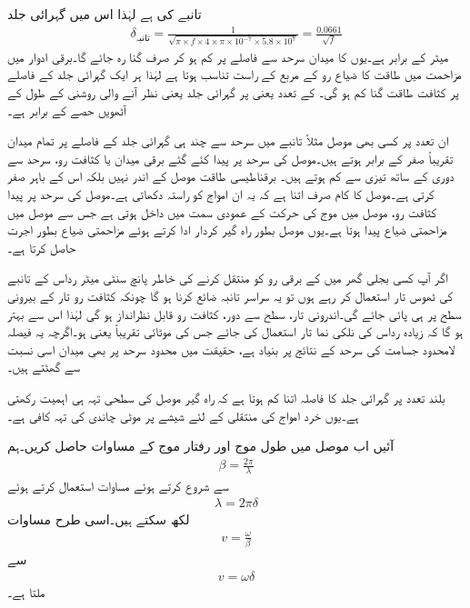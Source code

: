 تانبے کی  ہے لہٰذا اس میں گہرائی جلد
\begin{align*}
\delta_{\text{تانبہ}}=\frac{1}{\sqrt{\pi \times f  \times 4 \times \pi \times 10^{-7} \times 5.8 \times 10^{7}}}=\frac{0.0661}{\sqrt{f}}
\end{align*}
میٹر کے برابر ہے۔یوں  کا میدان سرحد سے  فاصلے پر کم ہو کر صرف  گنا رہ جائے گا۔برقی ادوار میں مزاحمت میں طاقت کا ضیاع رو کے مربع کے راست تناسب ہوتا ہے لہٰذا ہر ایک گہرائی جلد کے فاصلے پر کثافت طاقت  گنا کم ہو گی۔ کے تعدد یعنی  پر گہرائی جلد  یعنی نظر آنے والی روشنی کے طول کے آٹھویں حصے  کے برابر ہے۔

ان تعدد پر کسی بھی موصل مثلاً تانبے میں سرحد سے چند ہی گہرائی جلد کے فاصلے پر تمام میدان تقریباً صفر کے برابر ہوتے ہیں۔موصل کی سرحد پر پیدا کئے گئے برقی میدان یا کثافت رو، سرحد سے دوری کے ساتھ تیزی سے کم ہوتے ہیں۔ برقناطیسی طاقت موصل کے اندر نہیں بلکہ اس کے باہر صفر کرتی ہے۔موصل کا کام صرف اتنا ہے کہ یہ ان امواج کو راستہ دکھاتی ہے۔موصل کی سرحد پر پیدا کثافت رو، موصل میں موج کی حرکت کے عمودی سمت میں داخل ہوتی ہے جس سے موصل میں مزاحمتی ضیاع پیدا ہوتا ہے۔یوں موصل بطور راہ گیر  کردار ادا کرتے ہوئے مزاحمتی ضیاع بطور اجرت حاصل کرتا ہے۔  

اگر آپ کسی بجلی گھر میں   کے برقی رو کو منتقل کرنے کی خاطر پانچ سنٹی میٹر رداس کے تانبے کی ٹھوس تار استعمال کر رہے ہوں تو یہ سراسر تانبہ ضائع کرنا ہو گا چونکہ کثافت رو تار کے بیرونی سطح پر ہی پائی جائے گی۔اندرونی تار، سطح سے دور، کثافت رو قابل نظرانداز ہو گی لہٰذا اس سے بہتر ہو گا کہ زیادہ رداس کی نلکی نما تار استعمال کی جائے جس کی موٹائی تقریباً  یعنی  ہو۔اگرچہ یہ فیصلہ لامحدود جسامت کی سرحد کے نتائج پر بنیاد ہے، حقیقت میں محدود سرحد پر بھی میدان اسی نسبت سے گھٹتے ہیں۔

بلند تعدد پر گہرائی جلد کا فاصلہ اتنا کم ہوتا ہے کہ راہ گیر موصل کی سطحی تہہ ہی اہمیت رکھتی ہے۔یوں خرد امواج کی منتقلی کے لئے شیشے پر  موٹی چاندی کی تہہ کافی ہے۔

آئیں اب موصل میں طول موج اور رفتار موج کے مساوات حاصل کریں۔ہم
\begin{align*}
\beta=\frac{2\pi}{\lambda}
\end{align*}
سے شروع کرتے ہوئے مساوات  استعمال کرتے ہوئے
\begin{align*}
\lambda=2\pi\delta
\end{align*}
لکھ سکتے ہیں۔اسی طرح مساوات 
\begin{align*}
v=\frac{\omega}{\beta}
\end{align*}
سے
\begin{align}
v=\omega \delta
\end{align}
ملتا ہے۔

